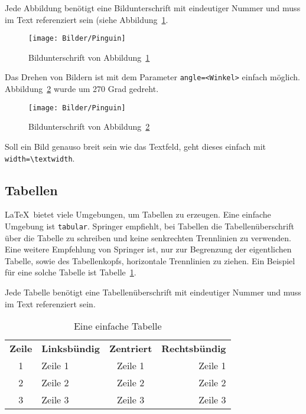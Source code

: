 \documentclass{llncs}
\begin{document}
Jede Abbildung benötigt eine Bildunterschrift mit eindeutiger Nummer und muss im Text referenziert sein (siehe Abbildung~\ref{Pinguin_Bild_Label}. 

\begin{figure}[htbp]
\begin{center}
\texttt{[image: Bilder/Pinguin]}
\caption{Bildunterschrift von Abbildung~\ref{Pinguin_Bild_Label}}
\label{Pinguin_Bild_Label} %
\end{center}
\end{figure}

Das Drehen von Bildern ist mit dem Parameter \texttt{angle=<Winkel>} einfach möglich. Abbildung~\ref{Pinguin_Bild_gedreht_Label} wurde um 270 Grad gedreht.

\begin{figure}[htbp]
\begin{center}
\texttt{[image: Bilder/Pinguin]}
\caption{Bildunterschrift von Abbildung~\ref{Pinguin_Bild_gedreht_Label}}
\label{Pinguin_Bild_gedreht_Label} %
\end{center}
\end{figure}

Soll ein Bild genauso breit sein wie das Textfeld, geht dieses einfach mit \verb!width=\textwidth!.

\subsection{Tabellen}

\LaTeX\ bietet viele Umgebungen, um Tabellen zu erzeugen. Eine einfache Umgebung ist \texttt{tabular}. Springer empfiehlt, bei Tabellen die Tabellenüberschrift über die Tabelle zu schreiben und keine senkrechten Trennlinien zu verwenden. Eine weitere Empfehlung von Springer ist, nur zur Begrenzung der eigentlichen Tabelle, sowie des Tabellenkopfs, horizontale Trennlinien zu ziehen. Ein Beispiel für eine solche Tabelle ist Tabelle~\ref{Einfache_Table_Label}.

Jede Tabelle benötigt eine Tabellenüberschrift mit eindeutiger Nummer und muss im Text referenziert sein.

\begin{table}
\centering
\caption{Eine einfache Tabelle}\label{Einfache_Table_Label}
\begin{tabular}{clcr}
\hline\noalign{\smallskip}
  \textbf{Zeile} & \textbf{Linksbündig} & \textbf{Zentriert} & \textbf{Rechtsbündig} \\
\noalign{\smallskip}
\hline
\noalign{\smallskip}
  1 & Zeile 1 & Zeile 1 & Zeile 1 \\
  2 & Zeile 2 & Zeile 2 & Zeile 2 \\
  3 & Zeile 3 & Zeile 3 & Zeile 3 \\
\hline
\end{tabular}
\end{table}
\end{document}
